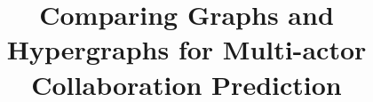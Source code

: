 \documentclass{sig-alternate}
\begin{document}
%

\title{Comparing Graphs and Hypergraphs for Multi-actor Collaboration Prediction}


%
%
%
%
%
\end{document}
